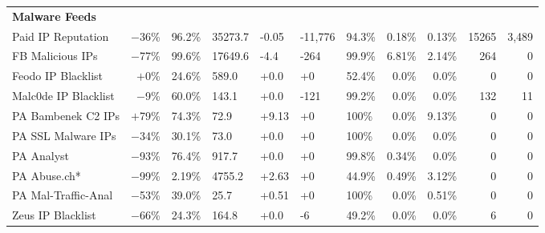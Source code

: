 \begin{table}[t!]
\begin{tabular}{l r H H H H H r r r r }
  \textbf{Malware Feeds} \\
  Paid IP Reputation 	       & $-$36\%	 & 96.2\% 	& 35273.7 	& -0.05     & -11,776   & 94.3\%& 0.18\%   & 0.13\% & 15265     & 3,489\\
  FB Malicious IPs 	           & $-$77\%   & 99.6\% 	& 17649.6   & -4.4      & -264      & 99.9\% & 6.81\%  & 2.14\% & 264     & 0   \\
  Feodo IP Blacklist 	       & $+$0\%    & 24.6\% 	& 589.0     & +0.0      & +0	    & 52.4\% & 0.0\%   & 0.0\% 	& 0      & 0 \\
  Malc0de IP Blacklist 	       & $-$9\%    & 60.0\%   & 143.1     & +0.0   	& -121      & 99.2\% & 0.0\%   & 0.0\%  & 132    & 11\\
  PA Bambenek C2 IPs 	       & $+$79\%   & 74.3\% 	& 72.9      & +9.13     & +0	    & 100\%  & 0.0\%   & 9.13\% & 0     & 0 \\
  PA SSL Malware IPs 	       & $-$34\%   & 30.1\% 	& 73.0      & +0.0      & +0	    & 100\%  & 0.0\%   & 0.0\%  & 0   & 0 \\
  PA Analyst 	               & $-$93\%    & 76.4\% 	& 917.7     & +0.0      & +0        & 99.8\% & 0.34\%  & 0.0\%  & 0  & 0\\
  PA Abuse.ch* 	               & $-$99\%   & 2.19\% 	& 4755.2    & +2.63     & +0        & 44.9\% & 0.49\%  & 3.12\% & 0  & 0\\
  PA Mal-Traffic-Anal  	       & $-$53\%   & 39.0\% 	& 25.7      & +0.51     & +0        & 100\%  & 0.0\%   & 0.51\%  & 0    & 0 \\
  Zeus IP Blacklist 	       & $-$66\%   & 24.3\%   & 164.8     & +0.0      & -6        & 49.2\% & 0.0\%   & 0.0\%   & 6  & 0\\
\bottomrule
\end{tabular}
\end{table}




